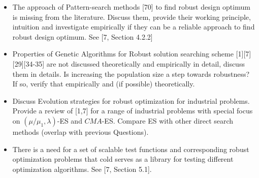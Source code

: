 \begin{itemize}
	\item The approach of Pattern-search methods [70] to find robust design optimum is missing from the literature. Discuss them, provide their working principle, intuition and investigate empirically if they can be a reliable approach to find robust design optimum. See [7, Section 4.2.2]
	
	\item Properties of Genetic Algorithms for Robust solution searching scheme [1][7][29][34-35] are not discussed theoretically and empirically in detail, discuss them in details. Is increasing the population size a step towards robustness? If so, verify that empirically and (if possible) theoretically.
	
	\item Discuss Evolution strategies for robust optimization for industrial problems. Provide a review of [1,7] for a range of industrial problems with special focus on $(\mu / \mu_{1}, \lambda)$-ES and $CMA$-ES. Compare ES with other direct search methods (overlap with previous Questions).
	
	\item There is a need for a set of scalable test functions and corresponding robust optimization problems that cold serves as a library for testing different optimization algorithms. See [7, Section 5.1].
\end{itemize}







 
  






